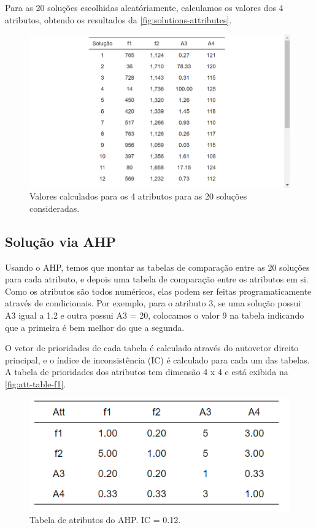 \documentclass[conference]{IEEEtran}
\begin{document}
Para as 20 soluções escolhidas aleatóriamente, calculamos os valores dos 4 atributos, 
obtendo os resultados da \autoref{fig:solutions-attributes}.

\begin{figure}[htbp]
    \centering
    \includegraphics[width=\columnwidth,trim=1 1 1 1,clip]{../images/solutions-attributes.png}
    \caption{\label{fig:solutions-attributes}
	Valores calculados para os 4 atributos para as 20 soluções consideradas.}
\end{figure}

\subsection{Solução via AHP}

Usando o AHP, temos que montar as tabelas de comparação entre as 20 
soluções para cada atributo, e depois uma tabela de comparação entre os 
atributos em si. Como os atributos são todos numéricos, elas podem ser feitas 
programaticamente através de condicionais. Por exemplo, para o atributo 3, se uma solução 
possui A3 igual a 1.2 e outra possui A3 = 20, colocamos o valor 9 na tabela indicando 
que a primeira é bem melhor do que a segunda.

O vetor de prioridades de cada tabela é calculado através do autovetor direito 
principal, e o índice de inconsistência (IC) é calculado para cada um das tabelas.
A tabela de prioridades dos atributos tem dimensão 4 x 4 e está exibida na 
\autoref{fig:att-table-f1}.

\begin{figure}[htbp]
    \centering
    \includegraphics[width=\columnwidth,trim=1 1 1 1,clip]{../images/att-table-f1.png}
    \caption{\label{fig:att-table-f1}
	Tabela de atributos do AHP. IC = 0.12.}
\end{figure}
\end{document}
